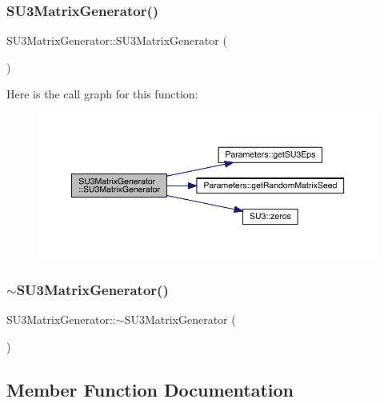 \subsubsection{\texorpdfstring{SU3MatrixGenerator()}{SU3MatrixGenerator()}}
{\footnotesize\ttfamily S\+U3\+Matrix\+Generator\+::\+S\+U3\+Matrix\+Generator (\begin{DoxyParamCaption}{ }\end{DoxyParamCaption})}

Here is the call graph for this function\+:
\nopagebreak
\begin{figure}[H]
\begin{center}
\leavevmode
\includegraphics[width=350pt]{class_s_u3_matrix_generator_ae76a62a4ba6af03901a0cc8e8632e856_cgraph}
\end{center}
\end{figure}
\mbox{\label{class_s_u3_matrix_generator_a58195e1974eed39db617eaea50778f47}} 
\subsubsection{\texorpdfstring{$\sim$SU3MatrixGenerator()}{~SU3MatrixGenerator()}}
{\footnotesize\ttfamily S\+U3\+Matrix\+Generator\+::$\sim$\+S\+U3\+Matrix\+Generator (\begin{DoxyParamCaption}{ }\end{DoxyParamCaption})}



\subsection{Member Function Documentation}
\mbox{\label{class_s_u3_matrix_generator_a06dc59b5a86ba6863b848ef1ca26629a}} 

